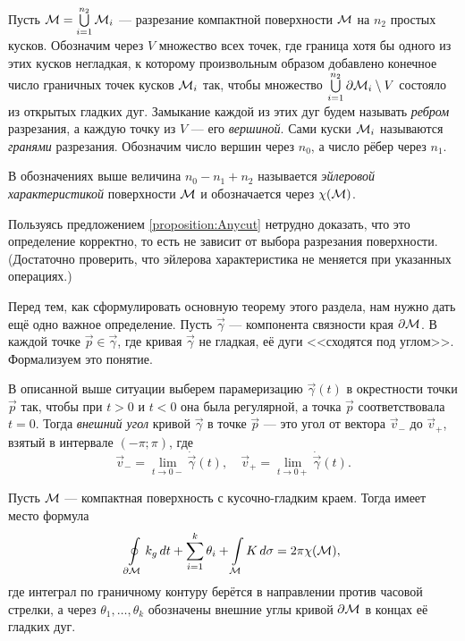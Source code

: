 Пусть $\mathcal{M} = \bigcup\limits_{i = 1}^{n_2}\mathcal{M}_i$ --- разрезание компактной поверхности $\mathcal{M}$ на $n_2$ простых кусков. Обозначим через $V$ множество всех точек, где граница хотя бы одного из этих кусков негладкая, к которому произвольным образом добавлено конечное число граничных точек кусков $\mathcal{M}_i$ так, чтобы множество $\bigcup\limits_{i = 1}^{n_2}\partial\mathcal{M}_i \setminus V$ состояло из открытых гладких дуг. Замыкание каждой из этих дуг будем называть \textit{ребром} разрезания, а каждую точку из $V$ --- его \textit{вершиной}. Сами куски $\mathcal{M}_i$ называются \textit{гранями} разрезания. Обозначим число вершин через $n_0$, а число рёбер через $n_1$.

\begin{definition}
	В обозначениях выше величина $n_0 - n_1 + n_2$ называется \textit{эйлеровой характеристикой} поверхности $\mathcal{M}$ и обозначается через $\chi(\mathcal{M})$.
\end{definition}

Пользуясь предложением \ref{proposition:Anycut} нетрудно доказать, что это определение корректно, то есть не зависит от выбора разрезания поверхности. (Достаточно проверить, что эйлерова характеристика не меняется при указанных операциях.)

Перед тем, как сформулировать основную теорему этого раздела, нам нужно дать ещё одно важное определение. Пусть $\vec{\gamma}$ --- компонента связности края $\partial\mathcal{M}$. В каждой точке $\vec{p} \in \vec{\gamma}$, где кривая $\vec{\gamma}$ не гладкая, её дуги <<сходятся под углом>>. Формализуем это понятие.

\begin{definition}
	В описанной выше ситуации выберем парамеризацию $\vec{\gamma}(t)$ в окрестности точки $\vec{p}$ так, чтобы при $t > 0$ и $t < 0$ она была регулярной, а точка $\vec{p}$ соответствовала $t = 0$. Тогда \textit{внешний угол} кривой $\vec{\gamma}$ в точке $\vec{p}$ --- это угол от вектора $\vec{v}_{-}$ до $\vec{v}_{+}$, взятый в интервале $(-\pi; \pi)$, где
	\[
		\vec{v}_{-} = \lim_{t \to 0-}\dot{\vec{\gamma}}(t),\quad
		\vec{v}_{+} = \lim_{t \to 0+}\dot{\vec{\gamma}}(t).
	\]
\end{definition} %

\begin{theorem}
	Пусть $\mathcal{M}$ --- компактная поверхность с кусочно-гладким краем. Тогда имеет место формула
	\begin{equation} \label{eq:GaussBonnet}
		\oint\limits_{\partial \mathcal{M}}k_g\,dt + \sum_{i = 1}^k\theta_i + \int\limits_{\mathcal{M}}K\,d\sigma = 2\pi\chi(\mathcal{M}),
	\end{equation}
	где интеграл по граничному контуру берётся в направлении против часовой стрелки, а через $\theta_1, \ldots, \theta_k$ обозначены внешние углы кривой $\partial \mathcal{M}$ в концах её гладких дуг.
\end{theorem}

